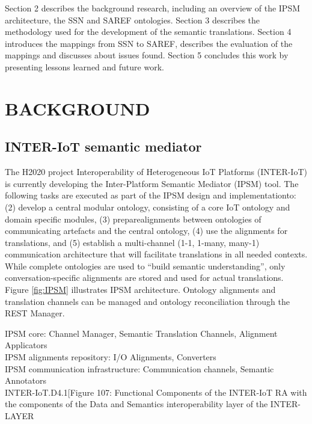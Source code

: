\documentclass{sig-alternate-05-2015}
\begin{document}
Section 2 describes the background research, including an overview of the IPSM architecture, the SSN and SAREF ontologies. Section 3 describes the methodology used for the development of the semantic translations. Section 4 introduces the mappings from SSN to SAREF, describes the evaluation of the mappings and discusses about issues found. Section 5 concludes this work by presenting lessons learned and future work. 

\section{BACKGROUND}

\subsection{INTER-IoT semantic mediator}
The H2020 project Interoperability of Heterogeneous IoT Platforms (INTER-IoT) \cite{Ganzha2016,Ganzha2017a} is currently developing the  Inter-Platform Semantic Mediator (IPSM) tool. The following tasks are executed as part of the IPSM design and implementationto:  (2) develop a central modular ontology, consisting of a core IoT ontology and domain specific modules, (3) preparealignments between ontologies of communicating artefacts and the central ontology,  (4) use the alignments for translations, and (5) establish a multi-channel (1-1, 1-many, many-1) communication architecture that will facilitate translations in all needed contexts. While complete ontologies are used to “build semantic understanding”, only conversation-specific alignments are stored and used for actual translations. Figure \ref{fig:IPSM} illustrates IPSM architecture. Ontology alignments and translation channels can be managed and ontology reconciliation  through the REST Manager.

IPSM core: Channel Manager, Semantic Translation Channels, Alignment Applicators \\
IPSM alignments repository: I/O Alignments, Converters \\
IPSM communication infrastructure: Communication channels, Semantic Annotators \\

INTER-IoT.D4.1[Figure 107: Functional Components of the INTER-IoT RA with the components of the Data and Semantics interoperability layer of the INTER-LAYER\\
\end{document}
